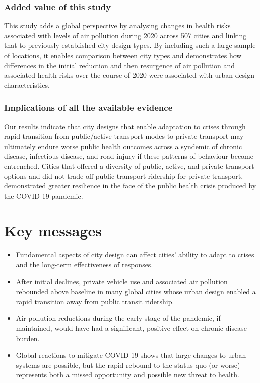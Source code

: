 \documentclass[preprint,10pt]{elsarticle} %
\begin{document}
    \subsubsection*{Added value of this study}
       This study adds a global perspective by analysing changes in health risks associated with levels of air pollution during 2020 across 507 cities and linking that to previously established city design types. By including such a large sample of locations, it enables comparison between city types and demonstrates how differences in the initial reduction and then resurgence of air pollution and associated health risks over the course of 2020 were associated with urban design characteristics.
    \subsubsection*{Implications of all the available evidence}
    Our results indicate that city designs that enable adaptation to crises through rapid transition from public/active transport modes to private transport may ultimately endure worse public health outcomes across a syndemic of chronic disease, infectious disease, and road injury if these patterns of behaviour become entrenched. Cities that offered a  diversity of public, active, and private transport options and did not trade off public transport ridership for private transport, demonstrated greater resilience in the face of the public health crisis produced by the COVID-19 pandemic.

\section*{Key messages}
\begin{itemize}
    \item[]  Fundamental aspects of city design can affect cities' ability to adapt to crises and the long-term effectiveness of responses.
    \item[] After initial declines, private vehicle use and associated air pollution rebounded above baseline in many global cities whose urban design enabled a rapid transition away from public transit ridership.
    \item[] Air pollution reductions during the early stage of the pandemic, if maintained, would have had a significant, positive effect on chronic disease burden. 
    \item[] Global reactions to mitigate COVID-19 shows that large changes to urban systems are possible, but the rapid rebound to the status quo (or worse) represents both a missed opportunity and possible new threat to health.
\end{itemize}
\end{document}

